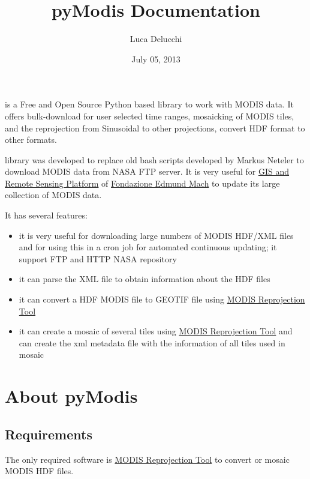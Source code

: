 \documentclass[a4paper,11pt,oneside]{sphinxmanual}
\title{pyModis Documentation}
\date{July 05, 2013}
\author{Luca Delucchi}
\begin{document}
\maketitle
\tableofcontents
{}\label{index::doc}


 is a Free and Open Source Python based library to work with MODIS data.
It offers bulk-download for user selected time ranges, mosaicking of MODIS tiles,
and the reprojection from Sinusoidal to other projections, convert HDF format to other formats.

 library was developed to replace old bash scripts developed by Markus
Neteler to download MODIS data from NASA FTP server. It is very useful for
\href{http://gis.cri.fmach.it}{GIS and Remote Sensing Platform} of \href{http://www.fmach.it}{Fondazione Edmund Mach} to update
its large collection of MODIS data.

It has several features:
\begin{itemize}
\item {} 
it is very useful for downloading large numbers of MODIS HDF/XML files
and for using this in a cron job for automated continuous updating; it
support FTP and HTTP NASA repository

\item {} 
it can parse the XML file to obtain information about the HDF files

\item {} 
it can convert a HDF MODIS file to GEOTIF file using \href{https://lpdaac.usgs.gov/lpdaac/tools/modis\_reprojection\_tool}{MODIS Reprojection Tool}

\item {} 
it can create a mosaic of several tiles using \href{https://lpdaac.usgs.gov/lpdaac/tools/modis\_reprojection\_tool}{MODIS Reprojection Tool} and can
create the xml metadata file with the information of all tiles used in mosaic

\end{itemize}


\chapter{About pyModis}
\label{info:welcome-to-pymodis}\label{info::doc}\label{info:about-pymodis}

\section{Requirements}
\label{info:requirements}
The only required software is \href{https://lpdaac.usgs.gov/tools/modis\_reprojection\_tool}{MODIS Reprojection Tool}
to convert or mosaic MODIS HDF files.
\end{document}
